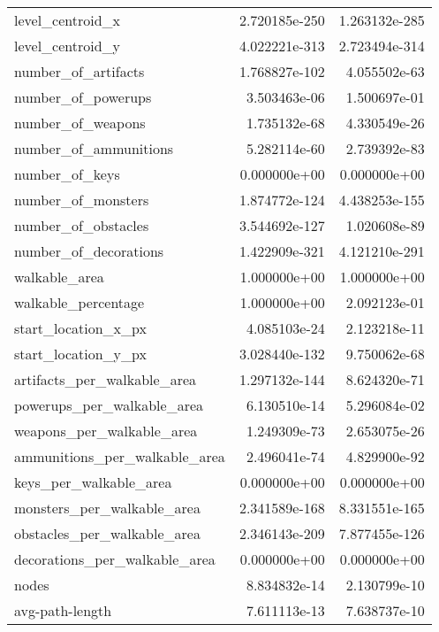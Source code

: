 \begin{longtable}{lrr}
	level\_centroid\_x              &  2.720185e-250 &  1.263132e-285 \\
	level\_centroid\_y              &  4.022221e-313 &  2.723494e-314 \\
	number\_of\_artifacts           &  1.768827e-102 &   4.055502e-63 \\
	number\_of\_powerups            &   3.503463e-06 &   1.500697e-01 \\
	number\_of\_weapons             &   1.735132e-68 &   4.330549e-26 \\
	number\_of\_ammunitions         &   5.282114e-60 &   2.739392e-83 \\
	number\_of\_keys                &   0.000000e+00 &   0.000000e+00 \\
	number\_of\_monsters            &  1.874772e-124 &  4.438253e-155 \\
	number\_of\_obstacles           &  3.544692e-127 &   1.020608e-89 \\
	number\_of\_decorations         &  1.422909e-321 &  4.121210e-291 \\
	walkable\_area                 &   1.000000e+00 &   1.000000e+00 \\
	walkable\_percentage           &   1.000000e+00 &   2.092123e-01 \\
	start\_location\_x\_px           &   4.085103e-24 &   2.123218e-11 \\
	start\_location\_y\_px           &  3.028440e-132 &   9.750062e-68 \\
	artifacts\_per\_walkable\_area   &  1.297132e-144 &   8.624320e-71 \\
	powerups\_per\_walkable\_area    &   6.130510e-14 &   5.296084e-02 \\
	weapons\_per\_walkable\_area     &   1.249309e-73 &   2.653075e-26 \\
	ammunitions\_per\_walkable\_area &   2.496041e-74 &   4.829900e-92 \\
	keys\_per\_walkable\_area        &   0.000000e+00 &   0.000000e+00 \\
	monsters\_per\_walkable\_area    &  2.341589e-168 &  8.331551e-165 \\
	obstacles\_per\_walkable\_area   &  2.346143e-209 &  7.877455e-126 \\
	decorations\_per\_walkable\_area &   0.000000e+00 &   0.000000e+00 \\
	nodes                         &   8.834832e-14 &   2.130799e-10 \\
	avg-path-length               &   7.611113e-13 &   7.638737e-10 \\

\end{longtable}
